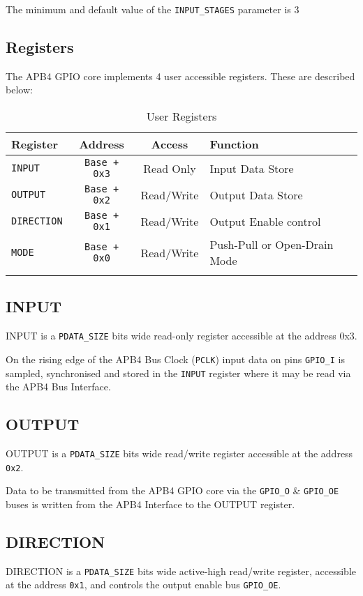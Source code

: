 The minimum and default value of the \texttt{INPUT\_STAGES} parameter is 3

\subsection{Registers}\label{registers}

The APB4 GPIO core implements 4 user accessible registers. These are
described below:

\begin{longtable}[]{@{}lccl@{}}
\toprule
\textbf{Register} & \textbf{Address} & \textbf{Access} & \textbf{Function}\tabularnewline
\midrule
\endhead
\texttt{INPUT} & \texttt{Base + 0x3} & Read Only & Input Data Store\tabularnewline
\texttt{OUTPUT} & \texttt{Base + 0x2} & Read/Write & Output Data Store\tabularnewline
\texttt{DIRECTION} & \texttt{Base + 0x1} & Read/Write & Output Enable
control\tabularnewline
\texttt{MODE} & \texttt{Base + 0x0} & Read/Write & Push-Pull or Open-Drain
Mode\tabularnewline
\bottomrule
\caption{User Registers}
\end{longtable}

\subsection{INPUT}\label{input}

INPUT is a \texttt{PDATA\_SIZE} bits wide read-only register accessible at the
address 0x3.

On the rising edge of the APB4 Bus Clock (\texttt{PCLK}) input data on pins
\texttt{GPIO\_I} is sampled, synchronised and stored in the \texttt{INPUT} register where
it may be read via the APB4 Bus Interface.

\subsection{OUTPUT}\label{output}

OUTPUT is a \texttt{PDATA\_SIZE} bits wide read/write register accessible at the
address \texttt{0x2}.

Data to be transmitted from the APB4 GPIO core via the \texttt{GPIO\_O} \&
\texttt{GPIO\_OE} buses is written from the APB4 Interface to the OUTPUT
register.

\subsection{DIRECTION}\label{direction}

DIRECTION is a \texttt{PDATA\_SIZE} bits
wide active-high read/write register, accessible at the address \texttt{0x1}, and
controls the output enable bus \texttt{GPIO\_OE}.

